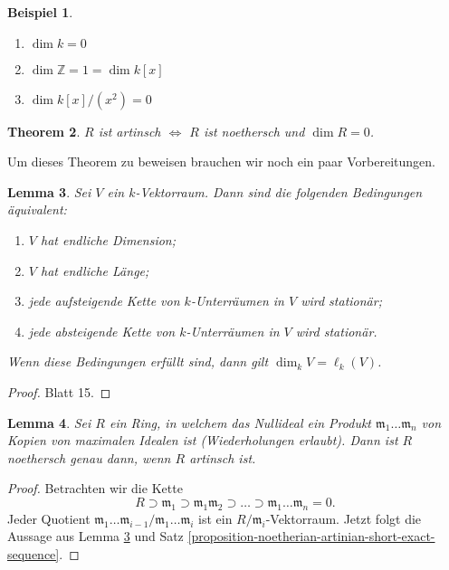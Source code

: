 \documentclass[reqno,12pt]{article}
\numberwithin{equation}{section}
\newcommand{\bZ}{\mathbb{Z}}
\theoremstyle{plain}
\newtheorem{thm}{Theorem}[section]
\newtheorem{lemma}[thm]{Lemma}
\theoremstyle{definition}
\newtheorem{example}[thm]{Beispiel}
\begin{document}
\begin{example}
\
\begin{enumerate}
\item $\dim k = 0$
\item $\dim \bZ = 1 = \dim k[x]$
\item $\dim k[x]/(x^2) = 0$
\end{enumerate}
\end{example}



\begin{thm}\label{thm-artinitan-noetherian-and-dim-zero}
$R$ ist artinsch $\iff$ $R$ ist noethersch und $\dim R = 0$.
\end{thm}

Um dieses Theorem zu beweisen brauchen wir noch ein paar Vorbereitungen.

\begin{lemma}\label{lemma:acc-dcc-vector-spaces}
Sei $V$ ein $k$-Vektorraum. Dann sind die folgenden Bedingungen äquivalent:
\begin{enumerate}
\item $V$ hat endliche Dimension;
\item $V$ hat endliche Länge;
\item jede aufsteigende Kette von $k$-Unterräumen in $V$ wird stationär;
\item jede absteigende Kette von $k$-Unterräumen in $V$ wird stationär.
\end{enumerate}
Wenn diese Bedingungen erfüllt sind, dann gilt $\dim_{k} V = \ell_k(V)$.
\end{lemma}

\begin{proof}
Blatt 15.
\end{proof}


\begin{lemma}\label{lemma-AM-Corollary-11.6}
Sei $R$ ein Ring, in welchem das Nullideal ein Produkt $\mathfrak{m}_1 \dots  \mathfrak{m}_n$ von Kopien von maximalen Idealen ist (Wiederholungen erlaubt). Dann ist $R$ noethersch genau dann, wenn $R$ artinsch ist.
\end{lemma}

\begin{proof}
Betrachten wir die Kette
\begin{equation*}
R \supset \mathfrak{m}_1 \supset \mathfrak{m}_1\mathfrak{m}_2 \supset \dots \supset \mathfrak{m}_1 \dots  \mathfrak{m}_n = 0.
\end{equation*}
Jeder Quotient $\mathfrak{m}_1 \dots  \mathfrak{m}_{i-1}/\mathfrak{m}_1 \dots  \mathfrak{m}_i$
ist ein $R/ \mathfrak{m}_i$-Vektorraum. Jetzt folgt die Aussage aus
Lemma \ref{lemma:acc-dcc-vector-spaces} und
Satz \ref{proposition-noetherian-artinian-short-exact-sequence}.
\end{proof}
\end{document}
